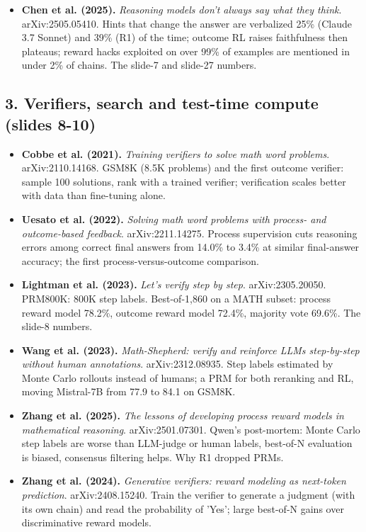 \documentclass[11pt,letterpaper]{article}
\begin{document}
\begin{itemize}[leftmargin=1.2em,itemsep=3pt]
\item \textbf{Chen et al. (2025).} \textit{Reasoning models don't always say what they think}. arXiv:2505.05410. Hints that change the answer are verbalized 25\% (Claude 3.7 Sonnet) and 39\% (R1) of the time; outcome RL raises faithfulness then plateaus; reward hacks exploited on over 99\% of examples are mentioned in under 2\% of chains. The slide-7 and slide-27 numbers.
\end{itemize}
\subsection*{3. Verifiers, search and test-time compute (slides 8-10)}
\begin{itemize}[leftmargin=1.2em,itemsep=3pt]\sloppy
\item \textbf{Cobbe et al. (2021).} \textit{Training verifiers to solve math word problems}. arXiv:2110.14168. GSM8K (8.5K problems) and the first outcome verifier: sample 100 solutions, rank with a trained verifier; verification scales better with data than fine-tuning alone.
\item \textbf{Uesato et al. (2022).} \textit{Solving math word problems with process- and outcome-based feedback}. arXiv:2211.14275. Process supervision cuts reasoning errors among correct final answers from 14.0\% to 3.4\% at similar final-answer accuracy; the first process-versus-outcome comparison.
\item \textbf{Lightman et al. (2023).} \textit{Let's verify step by step}. arXiv:2305.20050. PRM800K: 800K step labels. Best-of-1,860 on a MATH subset: process reward model 78.2\%, outcome reward model 72.4\%, majority vote 69.6\%. The slide-8 numbers.
\item \textbf{Wang et al. (2023).} \textit{Math-Shepherd: verify and reinforce LLMs step-by-step without human annotations}. arXiv:2312.08935. Step labels estimated by Monte Carlo rollouts instead of humans; a PRM for both reranking and RL, moving Mistral-7B from 77.9 to 84.1 on GSM8K.
\item \textbf{Zhang et al. (2025).} \textit{The lessons of developing process reward models in mathematical reasoning}. arXiv:2501.07301. Qwen's post-mortem: Monte Carlo step labels are worse than LLM-judge or human labels, best-of-N evaluation is biased, consensus filtering helps. Why R1 dropped PRMs.
\item \textbf{Zhang et al. (2024).} \textit{Generative verifiers: reward modeling as next-token prediction}. arXiv:2408.15240. Train the verifier to generate a judgment (with its own chain) and read the probability of 'Yes'; large best-of-N gains over discriminative reward models.

\end{itemize}
\end{document}
